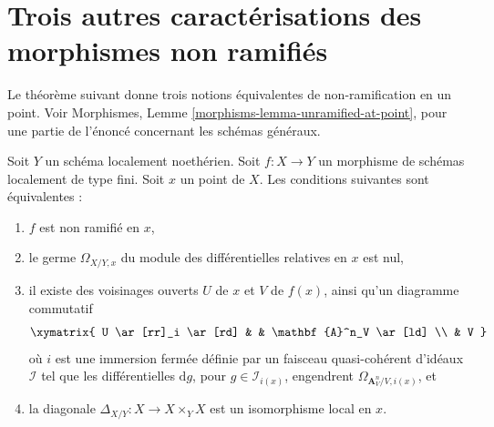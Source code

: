 \section{Trois autres caractérisations des morphismes non ramifiés}
\label{section-three-other}

\noindent
Le théorème suivant donne trois notions équivalentes de
non-ramification en un point. Voir
Morphismes, Lemme \ref{morphisms-lemma-unramified-at-point},
pour une partie de l'énoncé concernant les schémas généraux.

\begin{theorem}
\label{theorem-unramified-equivalence}
Soit $Y$ un schéma localement noethérien.
Soit $f : X \to Y$ un morphisme de schémas localement de type fini.
Soit $x$ un point de $X$. Les conditions suivantes sont équivalentes :
\begin{enumerate}
\item $f$ est non ramifié en $x$,
\item le germe $\Omega_{X/Y, x}$ du module des différentielles relatives
en $x$ est nul,
\item il existe des voisinages ouverts $U$ de $x$ et $V$ de $f(x)$, ainsi qu'un
diagramme commutatif
$$
\xymatrix{
U \ar[rr]_i \ar[rd] & & \mathbf{A}^n_V \ar[ld] \\
& V
}
$$
où $i$ est une immersion fermée définie par un
faisceau quasi-cohérent d'idéaux $\mathcal{I}$ tel que les différentielles
$\text{d}g$, pour $g \in \mathcal{I}_{i(x)}$, engendrent
$\Omega_{\mathbf{A}^n_V/V, i(x)}$, et
\item la diagonale $\Delta_{X/Y} : X \to X \times_Y X$
est un isomorphisme local en $x$.
\end{enumerate}
\end{theorem}

